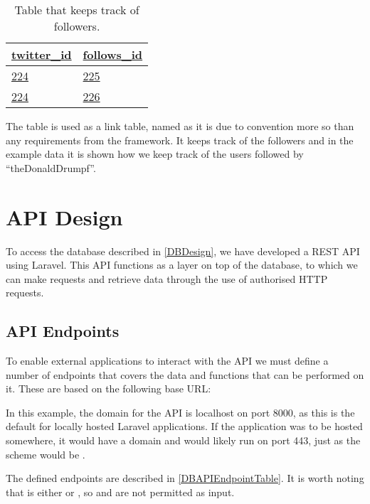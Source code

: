 \begin{table}[H]
\centering
\begin{tabular}{| l | l |}
\hline
\textbf{\underline{twitter\_id}} & \textbf{\underline{follows\_id}} \\
\hline
\underline{224} & \underline{225} \\
\hline
\underline{224} & \underline{226} \\
\hline
\end{tabular}
\caption{Table that keeps track of followers.}
\label{TwitterTwitterDBTable}
\end{table}

The table  is used as a link table, named as
it is due to convention more so than any requirements from the framework. It keeps track
of the followers and in the example data it is shown how we keep track of the
users followed by ``theDonaldDrumpf''.

\section{\acs{API} Design}\label{sec:APIDesign}
To access the database described in \autoref{DBDesign}, we have
developed a \ac{REST} \ac{API} using Laravel. This
\ac{API} functions as a layer on top of the database, to which we can make
requests and retrieve data through the use of authorised \ac{HTTP} requests.

\subsection{\acs{API} Endpoints}
To enable external applications to interact with the \ac{API} we must
define a number of endpoints that covers the data and functions that can be
performed on it. These are based on the following base \ac{URL}:\nl

\nl

In this example, the domain for the \ac{API} is localhost on port 8000, as this is
the default for locally hosted Laravel applications. If the application was to
be hosted somewhere, it would have a domain and would likely run on port 443,
just as the scheme would be .\nl

The defined endpoints are described in \autoref{DBAPIEndpointTable}. It is worth
noting that  is either  or , so  and
 are not permitted as input. 

